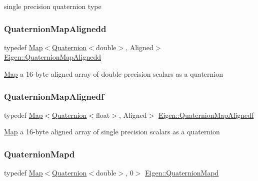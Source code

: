 single precision quaternion type \mbox{\label{group___geometry___module_ga4289f38cc6ecf302e07d2365abc6a902}} 
\subsubsection{\texorpdfstring{QuaternionMapAlignedd}{QuaternionMapAlignedd}}
{\footnotesize\ttfamily typedef \mbox{\hyperlink{class_eigen_1_1_map}{Map}}$<$\mbox{\hyperlink{class_eigen_1_1_quaternion}{Quaternion}}$<$double$>$, Aligned$>$ \mbox{\hyperlink{group___geometry___module_ga4289f38cc6ecf302e07d2365abc6a902}{Eigen\+::\+Quaternion\+Map\+Alignedd}}}

\mbox{\hyperlink{class_eigen_1_1_map}{Map}} a 16-\/byte aligned array of double precision scalars as a quaternion \mbox{\label{group___geometry___module_gadaf7f3ee984d9828ca94d66355f0b226}} 
\subsubsection{\texorpdfstring{QuaternionMapAlignedf}{QuaternionMapAlignedf}}
{\footnotesize\ttfamily typedef \mbox{\hyperlink{class_eigen_1_1_map}{Map}}$<$\mbox{\hyperlink{class_eigen_1_1_quaternion}{Quaternion}}$<$float$>$, Aligned$>$ \mbox{\hyperlink{group___geometry___module_gadaf7f3ee984d9828ca94d66355f0b226}{Eigen\+::\+Quaternion\+Map\+Alignedf}}}

\mbox{\hyperlink{class_eigen_1_1_map}{Map}} a 16-\/byte aligned array of single precision scalars as a quaternion \mbox{\label{group___geometry___module_ga89412d1dcf23537e5990dfb3089ace76}} 
\subsubsection{\texorpdfstring{QuaternionMapd}{QuaternionMapd}}
{\footnotesize\ttfamily typedef \mbox{\hyperlink{class_eigen_1_1_map}{Map}}$<$\mbox{\hyperlink{class_eigen_1_1_quaternion}{Quaternion}}$<$double$>$, 0$>$ \mbox{\hyperlink{group___geometry___module_ga89412d1dcf23537e5990dfb3089ace76}{Eigen\+::\+Quaternion\+Mapd}}}

